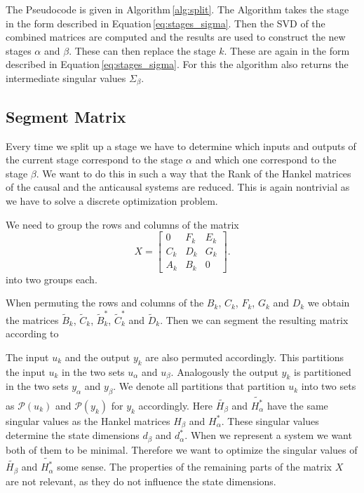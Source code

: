 \documentclass[doctype=mastersthesis,BCOR=15mm,biblatex]{ldvbook}%
\newcommand{\partition}{\mathcal{P}}
\begin{document}
The Pseudocode is given in Algorithm\,\ref{alg:split}.
The Algorithm takes the stage in the form described in Equation\,\ref{eq:stages_sigma}.
Then the SVD of the combined matrices are computed and the results are used to construct the new stages $\alpha$ and $\beta$.
These can then replace the stage $k$.
These are again in the form described in Equation\,\ref{eq:stages_sigma}.
For this the algorithm also returns the intermediate singular values $\Sigma_\beta$.




\subsection{Segment Matrix}\label{subsec:segment_matrix}
Every time we split up a stage we have to determine which inputs and outputs of the current stage correspond to the stage $\alpha$ and which one correspond to the stage $\beta$.
We want to do this in such a way that the Rank of the Hankel matrices of the causal and the anticausal systems are reduced.
This is again nontrivial as we have to solve a discrete optimization problem. 

We need to group the rows and columns of the matrix
\begin{equation}
X=
\begin{bmatrix}
	0   &F_k & E_k\\
	C_k & D_k & G_k\\
	A_k & B_k & 0
\end{bmatrix}
.
\end{equation}
into two groups each.

When permuting the rows and columns of the $B_k$, $C_k$, $F_k$, $G_k$ and $D_k$ we obtain the matrices $\tilde{B}_k$, $\tilde{C}_k$, $\tilde{B}_k^*$, $\tilde{C}_k^*$ and $\tilde{D}_k$.
Then we can segment the resulting matrix according to 



The input $u_k$ and the output $y_k$ are also permuted accordingly.
This partitions the input $u_k$ in the two sets $u_\alpha$ and $u_\beta$.
Analogously the output $y_k$ is partitioned in the two sets $y_\alpha$ and $y_\beta$.
We denote all partitions that partition $u_k$ into two sets as $\partition(u_k)$
and $\partition(y_k)$ for $y_k$ accordingly.
Here $\tilde{H_\beta}$ and $\tilde{H_\alpha^*}$ have the same singular values as the Hankel matrices $H_\beta$ and $H_\alpha^*$.
These singular values determine the state dimensions $d_\beta$ and $d_\alpha^*$.
When we represent a system we want both of them to be minimal.
Therefore we want to optimize the singular values of $\tilde{H_\beta}$ and $\tilde{H_\alpha^*}$ some sense. 
The properties of the remaining parts of the matrix $X$ are not relevant, as they do not influence the state dimensions.
\end{document}

